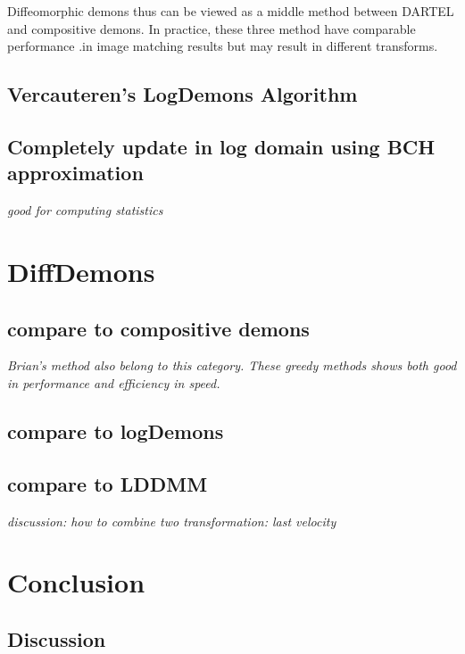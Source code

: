\documentclass[letterpaper,12pt]{article}
\begin{document}
Diffeomorphic demons thus can be viewed as a middle method between DARTEL and compositive demons. In practice, these three method have comparable performance \cite{Hernandez2008,Vercauteren2009}.in image matching results but may result in different transforms.


\subsection{Vercauteren's LogDemons Algorithm}









\subsection{Completely update in log domain using BCH approximation}
\textit{good for computing statistics}




\section{DiffDemons}
\subsection{compare to compositive demons}
\textit{Brian's method also belong to this category. These greedy methods shows both good in performance and efficiency in speed.}

\subsection{compare to logDemons}
\subsection{compare to LDDMM}
\textit{discussion: how to combine two transformation: last velocity }

 

\section{Conclusion}

\subsection{Discussion}
\end{document}
